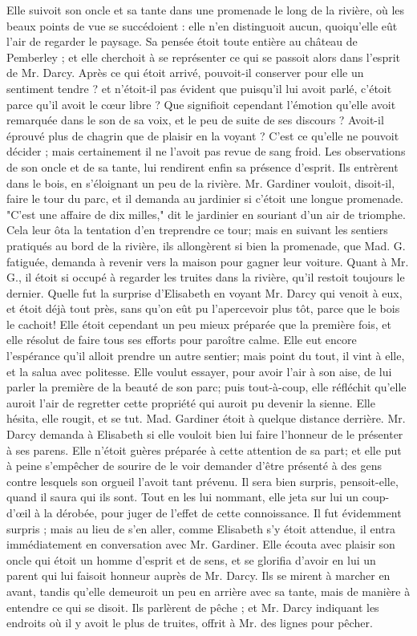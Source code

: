 Elle suivoit son oncle et sa tante dans une promenade le long de la rivière, où les beaux points de vue se succédoient : elle n'en distinguoit aucun, quoiqu'elle eût l'air de regarder le paysage. Sa pensée étoit toute entière au château de Pemberley ; et elle cherchoit à se représenter ce qui se passoit alors dans l'esprit de Mr. Darcy. Après ce qui étoit arrivé, pouvoit-il conserver pour elle un sentiment tendre ? et n'étoit-il pas évident que puisqu'il lui avoit parlé, c'étoit parce qu'il avoit le cœur libre ? Que signifioit cependant l'émotion qu'elle avoit remarquée dans le son de sa voix, et le peu de suite de ses discours ? Avoit-il éprouvé plus de chagrin que de plaisir en la voyant ? C'est ce qu'elle ne pouvoit décider ; mais certainement il ne l'avoit pas revue de sang froid. Les observations de son oncle et de sa tante, lui rendirent enfin sa présence d'esprit. Ils entrèrent dans le bois, en s'éloignant un peu de la rivière. Mr. Gardiner vouloit, disoit-il, faire le tour du parc, et il demanda au jardinier si c'étoit une longue promenade. "C'est une affaire de dix milles," dit le jardinier en souriant d'un air de triomphe. Cela leur ôta la tentation d'en\setcounter{page}{109} treprendre ce tour; mais en suivant les sentiers pratiqués au bord de la rivière, ils allongèrent si bien la promenade, que Mad. G. fatiguée, demanda à revenir vers la maison pour gagner leur voiture. Quant à Mr. G., il étoit si occupé à regarder les truites dans la rivière, qu'il restoit toujours le dernier. Quelle fut la surprise d'Elisabeth en voyant Mr. Darcy qui venoit à eux, et étoit déjà tout près, sans qu'on eût pu l'apercevoir plus tôt, parce que le bois le cachoit! Elle étoit cependant un peu mieux préparée que la première fois, et elle résolut de faire tous ses efforts pour paroître calme. Elle eut encore l'espérance qu'il alloit prendre un autre sentier; mais point du tout, il vint à elle, et la salua avec politesse. Elle voulut essayer, pour avoir l'air à son aise, de lui parler la première de la beauté de son parc; puis tout-à-coup, elle réfléchit qu'elle auroit l'air de regretter cette propriété qui auroit pu devenir la sienne. Elle hésita, elle rougit, et se tut. Mad. Gardiner étoit à quelque distance derrière. Mr. Darcy demanda à Elisabeth si elle vouloit bien lui faire l'honneur de le présenter à ses parens. Elle n'étoit guères préparée à cette attention de sa part; et elle put à peine s'empêcher de sourire de le voir demander d'être présenté à des gens contre\setcounter{page}{110} lesquels son orgueil l'avoit tant prévenu. Il sera bien surpris, pensoit-elle, quand il saura qui ils sont. Tout en les lui nommant, elle jeta sur lui un coup-d'œil à la dérobée, pour juger de l'effet de cette connoissance. Il fut évidemment surpris ; mais au lieu de s'en aller, comme Elisabeth s'y étoit attendue, il entra immédiatement en conversation avec Mr. Gardiner. Elle écouta avec plaisir son oncle qui étoit un homme d'esprit et de sens, et se glorifia d'avoir en lui un parent qui lui faisoit honneur auprès de Mr. Darcy. Ils se mirent à marcher en avant, tandis qu'elle demeuroit un peu en arrière avec sa tante, mais de manière à entendre ce qui se disoit. Ils parlèrent de pêche ; et Mr. Darcy indiquant les endroits où il y avoit le plus de truites, offrit à Mr. des lignes pour pêcher. 